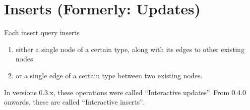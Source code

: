


\section{Inserts (Formerly: Updates)}
\label{sec:interactive-inserts}

Each insert query inserts

\begin{enumerate}
    \item either a single node of a certain type, along with its edges to other existing nodes
    \item or a single edge of a certain type between two existing nodes.
\end{enumerate}
In versions 0.3.x, these operations were called ``Interactive updates''.
From 0.4.0 onwards, these are called ``Interactive inserts''.


